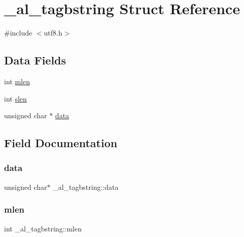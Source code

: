 \hypertarget{struct__al__tagbstring}{}\section{\+\_\+al\+\_\+tagbstring Struct Reference}
\label{struct__al__tagbstring}


{\ttfamily \#include $<$utf8.\+h$>$}

\subsection*{Data Fields}
\begin{DoxyCompactItemize}
\item 
int \hyperlink{struct__al__tagbstring_a302c29494670d9f2760fbbb0e9a0c435}{mlen}
\item 
int \hyperlink{struct__al__tagbstring_a96f3400977aa0706a99b2a4c51c1f429}{slen}
\item 
unsigned char $\ast$ \hyperlink{struct__al__tagbstring_a5b4df965648556d0f6cb15675a93037e}{data}
\end{DoxyCompactItemize}


\subsection{Field Documentation}
\mbox{\label{struct__al__tagbstring_a5b4df965648556d0f6cb15675a93037e}} 
\subsubsection{\texorpdfstring{data}{data}}
{\footnotesize\ttfamily unsigned char$\ast$ \+\_\+al\+\_\+tagbstring\+::data}

\mbox{\label{struct__al__tagbstring_a302c29494670d9f2760fbbb0e9a0c435}} 
\subsubsection{\texorpdfstring{mlen}{mlen}}
{\footnotesize\ttfamily int \+\_\+al\+\_\+tagbstring\+::mlen}

